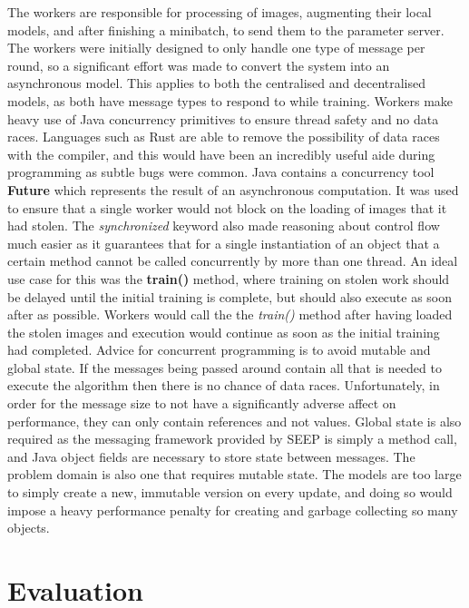 \documentclass[12pt]{article}
\begin{document}
The workers are responsible for processing of images, augmenting their local models, and after finishing a minibatch, to send them to the parameter server. The workers were initially designed to only handle one type of message per round, so a significant effort was made to convert the system into an asynchronous model. This applies to both the centralised and decentralised models, as both have message types to respond to while training.
\newline
\newline
Workers make heavy use of Java concurrency primitives to ensure thread safety and no data races. Languages such as Rust are able to remove the possibility of data races with the compiler, and this would have been an incredibly useful aide during programming as subtle bugs were common. Java contains a concurrency tool \textbf{Future} which represents the result of an asynchronous computation. It was used to ensure that a single worker would not block on the loading of images that it had stolen. The \textit{synchronized} keyword also made reasoning about control flow much easier as it guarantees that for a single instantiation of an object that a certain method cannot be called concurrently by more than one thread. An ideal use case for this was the \textbf{train()} method, where training on stolen work should be delayed until the initial training is complete, but should also execute as soon after as possible. Workers would call the the \textit{train()} method after having loaded the stolen images and execution would continue as soon as the initial training had completed.
\newline
\newline
Advice for concurrent programming is to avoid mutable and global state. If the messages being passed around contain all that is needed to execute the algorithm then there is no chance of data races. Unfortunately, in order for the message size to not have a significantly adverse affect on performance, they can only contain references and not values. Global state is also required as the messaging framework provided by SEEP is simply a method call, and Java object fields are necessary to store state between messages. The problem domain is also one that requires mutable state. The models are too large to simply create a new, immutable version on every update, and doing so would impose a heavy performance penalty for creating and garbage collecting so many objects.

\newpage

\section{Evaluation}
\end{document}

